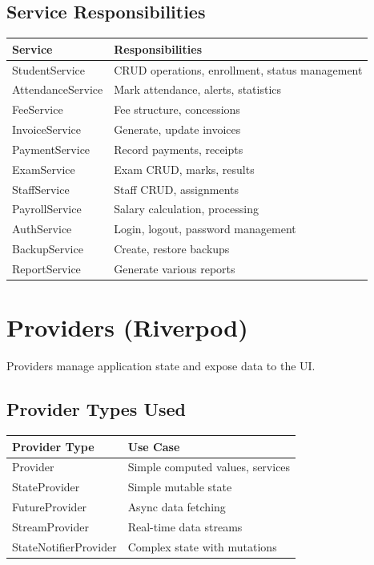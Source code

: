 \documentclass[12pt,a4paper]{report}
\begin{document}
\subsection{Service Responsibilities}

\begin{longtable}{@{}p{4cm}p{9cm}@{}}
\toprule
\textbf{Service} & \textbf{Responsibilities} \\
\midrule
\endhead
StudentService & CRUD operations, enrollment, status management \\
AttendanceService & Mark attendance, alerts, statistics \\
FeeService & Fee structure, concessions \\
InvoiceService & Generate, update invoices \\
PaymentService & Record payments, receipts \\
ExamService & Exam CRUD, marks, results \\
StaffService & Staff CRUD, assignments \\
PayrollService & Salary calculation, processing \\
AuthService & Login, logout, password management \\
BackupService & Create, restore backups \\
ReportService & Generate various reports \\
\bottomrule
\end{longtable}

\section{Providers (Riverpod)}

Providers manage application state and expose data to the UI.

\subsection{Provider Types Used}

\begin{longtable}{@{}p{4cm}p{9cm}@{}}
\toprule
\textbf{Provider Type} & \textbf{Use Case} \\
\midrule
\endhead
Provider & Simple computed values, services \\
StateProvider & Simple mutable state \\
FutureProvider & Async data fetching \\
StreamProvider & Real-time data streams \\
StateNotifierProvider & Complex state with mutations \\
\bottomrule
\end{longtable}
\end{document}
